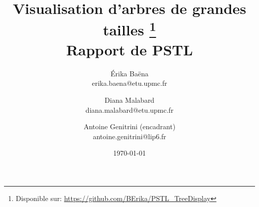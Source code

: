 \documentclass[a4paper,oneside]{report}
\title{Visualisation d'arbres de grandes tailles \footnote{Disponible sur: \url{https://github.com/BErika/PSTL_TreeDisplay}}\\ Rapport de PSTL}
\author{Érika Baëna\\ erika.baena@etu.upmc.fr \and Diana Malabard\\ diana.malabard@etu.upmc.fr \and Antoine Genitrini (encadrant)\\ antoine.genitrini@lip6.fr}
\date{\today}
\begin{document}
\maketitle
\tableofcontents

%


\abstract{} %






\appendix




\nocite{*}


\end{document}
